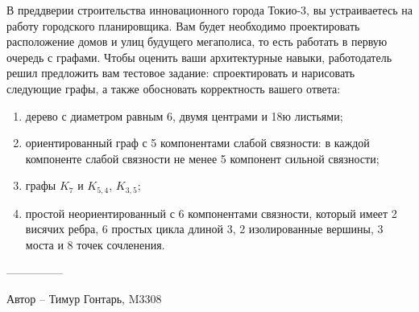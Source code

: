 \question
В преддверии строительства инновационного города Токио-3, вы устраиваетесь на работу городского планировщика. Вам будет необходимо проектировать расположение домов и улиц будущего мегаполиса, то есть работать в первую очередь с графами. Чтобы оценить ваши архитектурные навыки, работодатель решил предложить вам тестовое задание: спроектировать и нарисовать следующие графы, а также обосновать корректность вашего ответа:

\begin{enumerate}
\item  дерево с диаметром равным 6, двумя центрами и 18ю листьями;
\item  ориентированный граф с 5 компонентами слабой связности: в  каждой компоненте слабой связности не менее 5 компонент сильной связности;
\item  графы $K_7$ и $K_{5,4}$, $K_{3,5}$;
\item  простой неориентированный с 6 компонентами связности, который имеет 2 висячих ребра, 6 простых цикла длиной 3, 2 изолированные вершины, 3 моста и 8 точек сочленения.
\end{enumerate}

---------------

Автор -- Тимур Гонтарь, M3308
